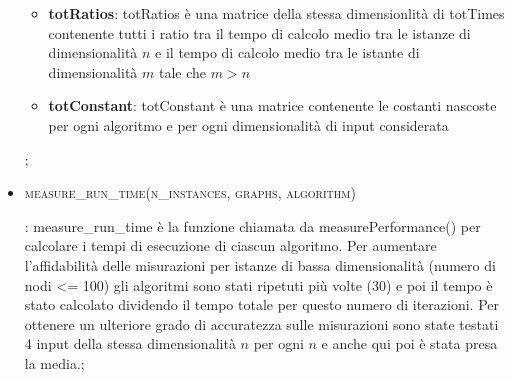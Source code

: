 \begin{itemize}
\begin{itemize}
        \item\textbf{totRatios}: totRatios è una matrice della stessa dimensionlità di totTimes contenente tutti i ratio tra il tempo di calcolo medio tra le istanze di dimensionalità $n$ e il tempo di calcolo medio tra le istante di dimensionalità $m$ tale che $m>n$
        
        \item  \textbf{totConstant}:  totConstant è una matrice contenente le costanti nascoste per ogni algoritmo e per ogni dimensionalità di input considerata
    \end{itemize};
    
    \item \hypertarget{measureruntime}{\textsc{measure\_run\_time(n\_instances, graphs, algorithm)}}: measure\_run\_time è la funzione chiamata da  measurePerformance() per calcolare i tempi di esecuzione di ciascun algoritmo. Per aumentare l'affidabilità delle misurazioni per istanze di bassa dimensionalità (numero di nodi <= 100) gli algoritmi sono stati ripetuti più volte (30) e poi il tempo è stato calcolato dividendo il tempo totale per questo numero di iterazioni. Per ottenere un ulteriore grado di accuratezza sulle misurazioni sono state testati 4 input della stessa dimensionalità $n$ per ogni $n$ e anche qui poi è stata presa la media.;
\end{itemize}


\newpage